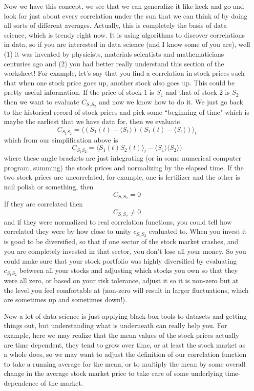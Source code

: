 \documentclass[]{revtex4}
\newcommand{\sm}[1]{{\[#1\]}}
\begin{document}
Now we have this concept, we see that we can generalize it like heck and go and look for just about every correlation under the sun that we can
think of by doing all sorts of different averages.
Actually, this is completely the basis of data science, which is trendy right now.  It is using algorithms to discover correlations in
data, so if you are interested in data science (and I know some of you are), well (1) it was invented by physicists, materials scientists
and mathematicians centuries ago and (2) you had better really understand this section of the worksheet!  For example, let's say that you find
a correlation in stock prices such that when one stock price goes up, another stock also goes up.  This could be pretty useful information.
If the price of stock 1 is $S_1$ and that of stock 2 is $S_2$ then we want to evaluate $C_{S_1S_2}$ and now we know how to do it.  We just go
back to the historical record of stock prices and pick some ``beginning of time" which is maybe the earliest that we have data for, then
we evaluate
\sm{ C_{S_1S_2} = \langle (S_1(t) - \langle S_1\rangle)(S_1(t) - \langle S_1\rangle)\rangle_t}
which from our simplification above is
\sm{C_{S_1S_2} = \langle S_1(t)S_2(t) \rangle_t - \langle S_1\rangle\langle S_2\rangle)}
where these angle brackets are just integrating (or in some numerical computer program, summing) the stock prices and normalizing by the elapsed time.
If the two stock prices are uncorrelated, for example, one is fertilizer and the other is nail polish or something, then
\sm{C_{S_1S_2}=0}
If they are correlated then
\sm{C_{S_1S_2}\ne 0}
and if they were normalized to real correlation functions, you could tell how correlated they were by how close to unity $c_{S_1S_2}$ evaluated to.
When you invest it is good to be diversified, so that if one sector of the stock market crashes, and you are completely invested in that sector,
you don't lose all your money.  So you could make sure that your stock portfolio was highly diversified by evaluating $c_{S_1S_2}$ between all your
stocks and adjusting which stocks you own so that they were all zero, or based on your risk tolerance, adjust it so it is non-zero but at the level
you feel comfortable at (non-zero will result in larger fluctuations, which are sometimes up and sometimes down!).

Now a lot of data science is just applying black-box tools to datasets and getting things out, but understanding what is underneath can really
help you.  For example, here we may realize that the mean values of the stock prices actually are time dependent, they tend to grow over time, or at
least the stock market as a whole does, so we may want to adjust the definition of our correlation function to take a running average for the mean,
or to multiply the mean by some overall change in the average stock market price to take care of some underlying time-dependence of the market.
\end{document}
